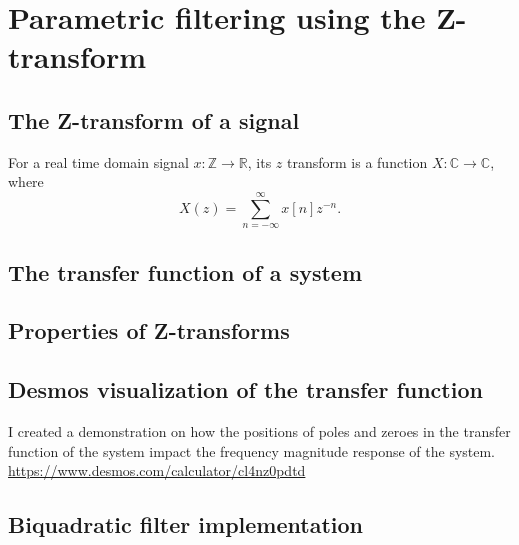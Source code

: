 \section{Parametric filtering using the Z-transform}
\subsection{The Z-transform of a signal}
For a real time domain signal $x:\mathbb{Z}\to\mathbb{R}$, its $z$ transform is a function $X:\mathbb{C}\to\mathbb{C}$, where
$$X(z)=\sum_{n=-\infty}^{\infty}x[n]z^{-n}.$$

\subsection{The transfer function of a system}

\subsection{Properties of Z-transforms}


\subsection{Desmos visualization of the transfer function}
I created a demonstration on how the positions of poles and zeroes in the 
transfer function of the system impact the frequency magnitude response of the system.
\href{https://www.desmos.com/calculator/cl4nz0pdtd}{https://www.desmos.com/calculator/cl4nz0pdtd}

\subsection{Biquadratic filter implementation}

